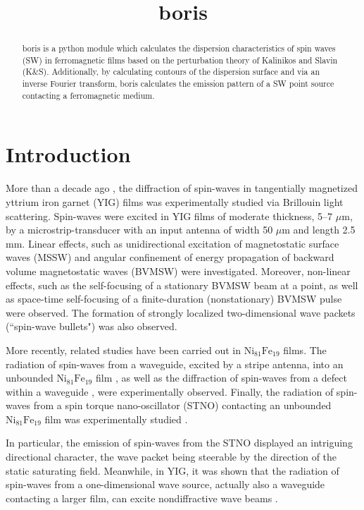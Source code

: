\documentclass{article}
\title{boris}
\begin{document}
\maketitle
\begin{abstract}
boris is a python module which calculates the dispersion characteristics of spin waves (SW) in ferromagnetic films based on the perturbation theory of Kalinikos and Slavin (K\&{}S). Additionally, by calculating contours of the dispersion surface and via an inverse Fourier transform, boris calculates the emission pattern of a SW point source contacting a ferromagnetic medium. 
\end{abstract}
\section{Introduction}
More than a decade ago \cite{SD_kaiser_2000}, the diffraction of spin-waves in tangentially magnetized yttrium iron garnet (YIG) films was experimentally studied via Brillouin light scattering. 
Spin-waves were excited in YIG films of moderate thickness, 5--7 $\mu$m, by a microstrip-transducer with an input antenna of width 50 $\mu$m and length 2.5 mm. 
Linear effects, such as unidirectional excitation of magnetostatic surface waves (MSSW) and angular confinement of energy propagation of backward volume magnetostatic waves (BVMSW) were investigated. 
Moreover, non-linear effects, such as the self-focusing of a stationary BVMSW beam at a point, as well as space-time self-focusing of a finite-duration (nonstationary) BVMSW pulse were observed. 
The formation of strongly localized two-dimensional wave packets (``spin-wave bullets") was also observed.

More recently, related studies have been carried out in $\text{Ni}_{81}\text{Fe}_{19}$ films. 
The radiation of spin-waves from a waveguide, excited by a stripe antenna, into an unbounded $\text{Ni}_{81}\text{Fe}_{19}$ film \cite{VS_texas}, as well as the diffraction of spin-waves from a defect within a waveguide \cite{VS_texas_apl}, were experimentally observed. 
Finally, the radiation of spin-waves from a spin torque nano-oscillator (STNO) contacting an unbounded $\text{Ni}_{81}\text{Fe}_{19}$ film was experimentally studied \cite{VSS_stno}.

In particular, the emission of spin-waves from the STNO \cite{VSS_stno} displayed an intriguing directional character, the wave packet being steerable by the direction of the static saturating field. 
Meanwhile, in YIG, it was shown that the radiation of spin-waves from a one-dimensional wave source, actually also a waveguide contacting a larger film, can excite nondiffractive wave beams \cite{thomas}.
\end{document}
